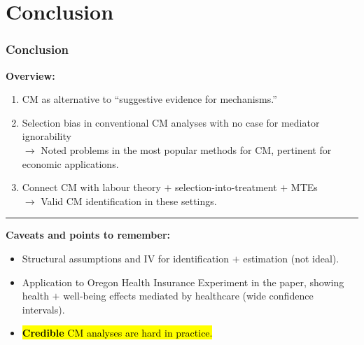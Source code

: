 \documentclass[dvipsnames]{beamer} %
\makeatletter
\let\HL\hl
\renewcommand\hl{%
    \let\set@color\beamerorig@set@color
    \let\reset@color\beamerorig@reset@color
    \HL}
\makeatother
\begin{document}
\section{Conclusion}
\begin{frame}
    \frametitle{Conclusion}
    \textbf{Overview:}
    \begin{enumerate}
        \item CM as alternative to ``suggestive evidence for mechanisms.''
        \item Selection bias in conventional CM analyses with no case for mediator ignorability \\
        $\to$ Noted problems in the most popular methods for CM, pertinent for economic applications.
        \item Connect CM with labour theory $+$ selection-into-treatment $+$ MTEs \\
        $\to$ Valid CM identification in these settings.
    \end{enumerate}
    \par\noindent\rule{\textwidth}{0.4pt}
    \small
    \textbf{Caveats and points to remember:}
    \begin{itemize}
        \item Structural assumptions and IV for identification $+$ estimation (not ideal).
        \item Application to Oregon Health Insurance Experiment in the paper, showing health $+$ well-being effects mediated by healthcare (wide confidence intervals).
        \item \hl{\textbf{Credible} CM analyses are hard in practice.}
    \end{itemize}
\end{frame}
%
\end{document}
